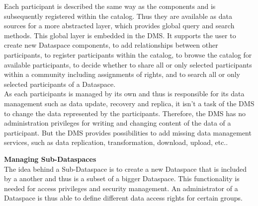Each participant is described the same way as the components and is subsequently registered within the catalog. Thus they are available as data sources for a more abstracted layer, which provides global query and search methods. This global layer is embedded in the DMS. It supports the user to create new Dataspace components, to add relationships between other participants, to register participants within the catalog, to browse the catalog for available participants, to decide whether to share all or only  selected participants within a community including assignments of rights, and to search all or only selected participants of a Dataspace.\\
As each participants is managed by its own and thus is responsible for its data management such as data update, recovery and replica, it isn't a task of the DMS to change the data represented by the participants. Therefore, the DMS has no administration privileges for writing and changing content of the data of a participant. But the DMS provides possibilities to add missing data management services, such as data replication, transformation, download, upload, etc.. 

\textbf{Managing Sub-Dataspaces}\\
The idea behind a Sub-Dataspace is to create a new Dataspace that is included by a another and thus is a subset of a  bigger Dataspace. This functionality is needed for access privileges and security management. An administrator of a Dataspace is thus able to define different data access rights for certain groups.  
